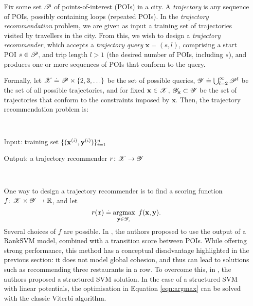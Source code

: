 
Fix some set $\mathscr{P}$ of points-of-interest (POIs) in a city.
A \emph{trajectory} is any sequence of POIs, possibly containing loops (repeated POIs).
In the \emph{trajectory recommendation} problem, we are given as input a training set of trajectories visited by travellers in the city.
From this, we wish to design a \emph{trajectory recommender}, which accepts a
\emph{trajectory query} $\mathbf{x} = (s, l)$, comprising a start POI $s \in \mathscr{P}$, and trip length $l \!>\! 1$ (\ie the desired number of POIs, including $s$),
and produces one or more sequences of POIs that conform to the query.

Formally, let $\mathscr{X} \stackrel{.}{=} \mathscr{P} \times \{ 2, 3, \ldots \}$ be the set of possible queries,
$\mathscr{Y} \stackrel{.}{=} \bigcup_{l = 2}^\infty \mathscr{P}^l$ be the set of all possible trajectories,
and for fixed $\mathbf{x} \in \mathscr{X}$, $\mathscr{Y}_{\mathbf{x}} \subset \mathscr{Y}$ be the set of trajectories that conform to the constraints imposed by $\mathbf{x}$.
Then, the {trajectory recommendation} problem is:

\

{\sc Input}: training set $\{ ( \mathbf{x}^{(i)}, \mathbf{y}^{(i)} ) \}_{i = 1}^n$ %

{\sc Output}: a trajectory recommender $r \colon \mathscr{X} \to \mathscr{Y}$ 

\

One way to design a trajectory recommender is to find a scoring function $f \colon \mathscr{X} \times \mathscr{Y} \to \mathbb{R}$, and let
\begin{equation}
	\label{eqn:argmax}
	r( x ) \stackrel{.}{=} \operatorname*{argmax}_{\mathbf{y} \in \mathscr{Y}_x}~f(\mathbf{x}, \mathbf{y}).
\end{equation}
Several choices of $f$ are possible.
In \citet{cikm16paper}, the authors proposed to use the output of a RankSVM model, combined with a transition score between POIs.
While offering strong performance, this method has a conceptual disadvantage highlighted in the previous section:
it does not model global cohesion, and thus can lead to solutions such as recommending three restaurants in a row.
To overcome this, in \citet{Chen:2017}, the authors proposed a structured SVM solution.
In the case of a structured SVM with linear potentials, the optimisation in Equation \ref{eqn:argmax} can be solved with the classic Viterbi algorithm.


